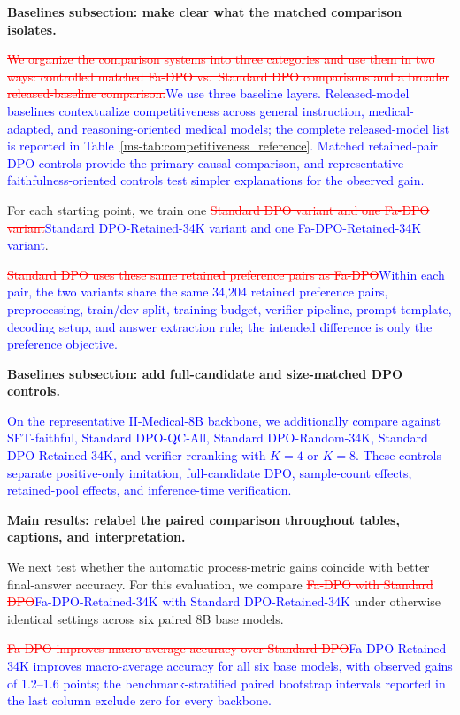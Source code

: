 \documentclass[12pt]{article}
\newcommand{\deleted}[1]{\textcolor{red}{\sout{#1}}}
\newcommand{\added}[1]{\textcolor{blue}{#1}}
\begin{document}
\textbf{Baselines subsection: make clear what the matched comparison isolates.}
\begin{displayquote}
\deleted{We organize the comparison systems into three categories and use them in two
ways: controlled matched Fa-DPO vs.\ Standard DPO comparisons and a broader
released-baseline comparison.}\added{We use three baseline layers. Released-model baselines contextualize competitiveness across general instruction, medical-adapted, and reasoning-oriented medical models; the complete released-model list is reported in Table~\ref*{ms-tab:competitiveness_reference}. Matched retained-pair DPO controls provide the primary causal comparison, and representative faithfulness-oriented controls test simpler explanations for the observed gain.}

For each starting point, we train one \deleted{Standard DPO variant and one
Fa-DPO variant}\added{Standard DPO-Retained-34K variant and one
Fa-DPO-Retained-34K variant}.

\deleted{Standard DPO uses these same retained preference pairs as Fa-DPO}\added{Within each pair, the two variants share the same 34,204 retained preference pairs, preprocessing, train/dev split, training budget, verifier pipeline, prompt template, decoding setup, and answer extraction rule; the intended difference is only the preference objective.}
\end{displayquote}

\textbf{Baselines subsection: add full-candidate and size-matched DPO controls.}
\begin{displayquote}
\added{On the representative II-Medical-8B backbone, we additionally compare against SFT-faithful, Standard DPO-QC-All, Standard DPO-Random-34K, Standard DPO-Retained-34K, and verifier reranking with $K=4$ or $K=8$. These controls separate positive-only imitation, full-candidate DPO, sample-count effects, retained-pool effects, and inference-time verification.}
\end{displayquote}

\textbf{Main results: relabel the paired comparison throughout tables, captions, and
interpretation.}
\begin{displayquote}
We next test whether the automatic process-metric gains coincide with better final-answer
accuracy. For this evaluation, we compare \deleted{Fa-DPO with Standard
DPO}\added{Fa-DPO-Retained-34K with Standard DPO-Retained-34K} under otherwise
identical settings across six paired 8B base models.

\deleted{Fa-DPO improves macro-average accuracy over Standard DPO}\added{Fa-DPO-Retained-34K improves macro-average accuracy for all six base models, with observed gains of 1.2--1.6 points; the benchmark-stratified paired bootstrap intervals reported in the last column exclude zero for every backbone.}
\end{displayquote}
\end{document}
